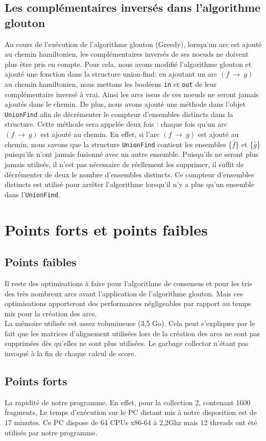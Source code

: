 \documentclass[a4paper, 12pt, titlepage]{article}
\newcommand{\arc}[2]{$(#1~\rightarrow~#2)$}
\begin{document}
\subsection{Les complémentaires inversés dans l'algorithme glouton}%
Au cours de l'exécution de l'algorithme glouton (Greedy), lorsqu'un arc est ajouté au chemin hamiltonien, les complémentaires inversés de ses noeuds ne doivent plus être pris en compte.
Pour cela, nous avons modifié l'algorithme glouton et ajouté une fonction dans la structure union-find:
en ajoutant un arc \arc{f}{g} au chemin hamiltonien, nous mettons les booléens \texttt{in} et \texttt{out} de leur complémentaire inversé à vrai.
Ainsi les arcs issus de ces noeuds ne seront jamais ajoutés dans le chemin.
De plus, nous avons ajouté une méthode dans l'objet \texttt{UnionFind} afin de décrémenter le compteur d'ensembles distincts dans la structure.
Cette méthode sera appelée deux fois : chaque fois qu'un arc \arc{f}{g} est ajouté au chemin.
En effet, si l'arc \arc{f}{g} est ajouté au chemin, nous savons que la structure \texttt{UnionFind} contient les ensembles \{$\bar{f}$\} et \{$\bar{g}$\} puisqu'ils n'ont jamais fusionné avec un autre ensemble.
Puisqu'ils ne seront plus jamais utilisés, il n'est pas nécessaire de
réellement les supprimer, il suffit de décrémenter de deux le nombre d'ensembles distincts.
Ce compteur d'ensembles distincts est utilisé pour arrêter l'algorithme
lorsqu'il n'y a plus qu'un ensemble dans l'\texttt{UnionFind}.





\section{Points forts et points faibles}
\subsection*{Points faibles}
Il reste des optimisations à faire pour l'algorithme de consensus et pour les tris des très nombreux arcs avant l'application de l'algorithme glouton.
Mais ces optimisations apporteront des performances négligeables par rapport au temps mis pour la création des arcs.\\

La mémoire utilisée est assez volumineuse (3,5 Go).
Cela peut s'expliquer par le fait que les matrices d'alignement utilisées lors de la création des arcs ne sont pas supprimées dès qu'elles ne sont plus utilisées.
Le garbage collector n'étant pas invoqué à la fin de chaque calcul de score.

\subsection*{Points forts}
La rapidité de notre programme. En effet, pour la collection 2, contenant 1600 fragments,
Le temps d'exécution sur le PC distant mis à notre disposition est de 17 minutes.
Ce PC dispose de 64 CPUs x86-64 à 2,2Ghz mais 12 threads ont été utilisés par notre programme.
\end{document}
